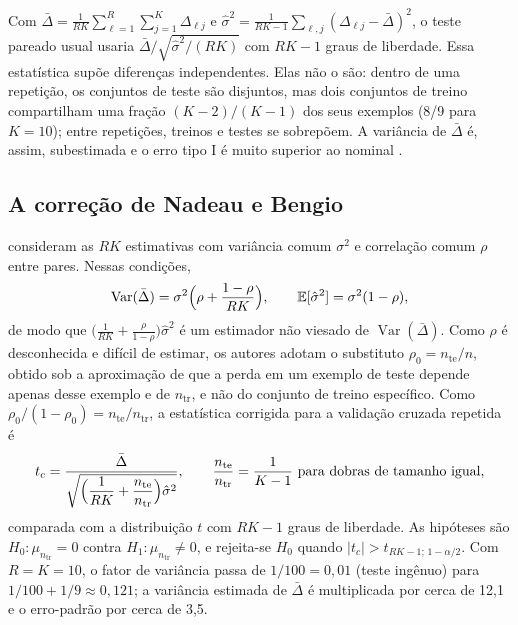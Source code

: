 \documentclass[11pt,a4paper]{article}
\newcommand{\tr}{\mathrm{tr}}
\newcommand{\te}{\mathrm{te}}
\newcommand{\E}{\mathbb{E}}
\newcommand{\Var}{\operatorname{Var}}
\begin{document}
Com $\bar\Delta=\frac{1}{RK}\sum_{\ell=1}^{R}\sum_{j=1}^{K}\Delta_{\ell j}$ e
$\hat\sigma^{2}=\frac{1}{RK-1}\sum_{\ell,j}(\Delta_{\ell j}-\bar\Delta)^2$, o teste pareado
usual usaria $\bar\Delta/\sqrt{\hat\sigma^2/(RK)}$ com $RK-1$ graus de liberdade.
Essa estatística supõe diferenças independentes. Elas não o são: dentro de uma
repetição, os conjuntos de teste são disjuntos, mas dois conjuntos de treino
compartilham uma fração $(K-2)/(K-1)$ dos seus exemplos (8/9 para $K=10$);
entre repetições, treinos e testes se sobrepõem. A variância de $\bar\Delta$ é,
assim, subestimada e o erro tipo I é muito superior ao nominal
\citep{dietterich1998approximate,bouckaert2004replicability}.

\subsection{A correção de Nadeau e Bengio}

\citet{nadeau2003inference} consideram as $RK$ estimativas com variância comum
$\sigma^2$ e correlação comum $\rho$ entre pares. Nessas condições,
\begin{equation}
  \Var(\bar\Delta)=\sigma^{2}\Bigl(\rho+\frac{1-\rho}{RK}\Bigr),
  \qquad
  \E[\hat\sigma^{2}]=\sigma^{2}(1-\rho),
\end{equation}
de modo que $\bigl(\frac{1}{RK}+\frac{\rho}{1-\rho}\bigr)\hat\sigma^{2}$ é um
estimador não viesado de $\Var(\bar\Delta)$. Como $\rho$ é desconhecida e difícil
de estimar, os autores adotam o substituto $\rho_0=n_{\te}/n$, obtido sob a
aproximação de que a perda em um exemplo de teste depende apenas desse
exemplo e de $n_{\tr}$, e não do conjunto de treino específico. Como
$\rho_0/(1-\rho_0)=n_{\te}/n_{\tr}$, a estatística corrigida para a validação
cruzada repetida \citep{bouckaert2004replicability} é
\begin{equation}
  t_c=\frac{\bar\Delta}{\sqrt{\Bigl(\dfrac{1}{RK}+\dfrac{n_{\te}}{n_{\tr}}\Bigr)\hat\sigma^{2}}},
  \qquad
  \frac{n_{\te}}{n_{\tr}}=\frac{1}{K-1}\ \text{para dobras de tamanho igual},
  \label{eq:tcorrigido}
\end{equation}
comparada com a distribuição $t$ com $RK-1$ graus de liberdade. As hipóteses
são $H_0:\mu_{n_{\tr}}=0$ contra $H_1:\mu_{n_{\tr}}\neq0$, e rejeita-se $H_0$
quando $|t_c|>t_{RK-1;\,1-\alpha/2}$. Com $R=K=10$, o fator de variância passa
de $1/100=0{,}01$ (teste ingênuo) para $1/100+1/9\approx0{,}121$; a variância
estimada de $\bar\Delta$ é multiplicada por cerca de 12,1 e o erro-padrão por
cerca de 3,5.
\end{document}
